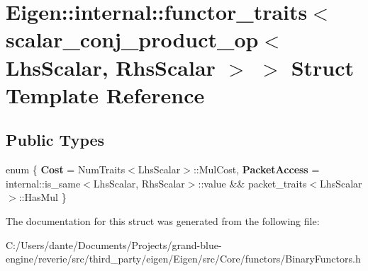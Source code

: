\hypertarget{struct_eigen_1_1internal_1_1functor__traits_3_01scalar__conj__product__op_3_01_lhs_scalar_00_01_rhs_scalar_01_4_01_4}{}\section{Eigen\+::internal\+::functor\+\_\+traits$<$ scalar\+\_\+conj\+\_\+product\+\_\+op$<$ Lhs\+Scalar, Rhs\+Scalar $>$ $>$ Struct Template Reference}
\label{struct_eigen_1_1internal_1_1functor__traits_3_01scalar__conj__product__op_3_01_lhs_scalar_00_01_rhs_scalar_01_4_01_4}
\subsection*{Public Types}
\begin{DoxyCompactItemize}
\item 
\mbox{\label{struct_eigen_1_1internal_1_1functor__traits_3_01scalar__conj__product__op_3_01_lhs_scalar_00_01_rhs_scalar_01_4_01_4_a19de2667f782e81cb655a57a5c955109}} 
enum \{ {\bfseries Cost} = Num\+Traits$<$Lhs\+Scalar$>$\+::Mul\+Cost, 
{\bfseries Packet\+Access} = internal\+::is\+\_\+same$<$Lhs\+Scalar, Rhs\+Scalar$>$\+::value \&\& packet\+\_\+traits$<$Lhs\+Scalar$>$\+::Has\+Mul
 \}
\end{DoxyCompactItemize}


The documentation for this struct was generated from the following file\+:\begin{DoxyCompactItemize}
\item 
C\+:/\+Users/dante/\+Documents/\+Projects/grand-\/blue-\/engine/reverie/src/third\+\_\+party/eigen/\+Eigen/src/\+Core/functors/Binary\+Functors.\+h\end{DoxyCompactItemize}

